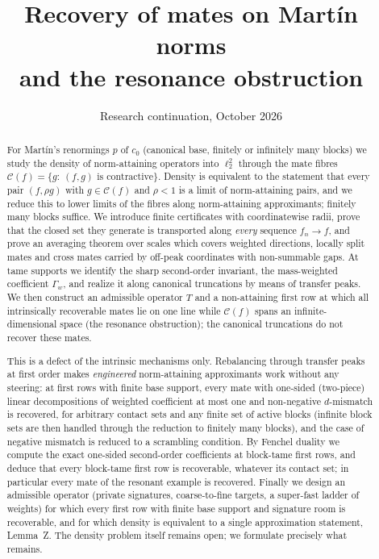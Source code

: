 \documentclass[10pt]{amsart}
\title{Recovery of mates on Mart\'in norms\\and the resonance obstruction}
\author{}
\date{Research continuation, October 2026}
\theoremstyle{definition}
\theoremstyle{remark}
\newcommand{\Cset}{\mathcal C}
\begin{document}
\begin{abstract}
For Mart\'in's renormings $p$ of $c_0$ (canonical base, finitely or
infinitely many blocks) we study the density of norm-attaining operators
into $\ell_2^2$ through the mate fibres
$\Cset(f)=\{g:\ (f,g)\text{ is contractive}\}$.  Density is equivalent to the
statement that every pair $(f,\rho g)$ with $g\in\Cset(f)$ and $\rho<1$ is a
limit of norm-attaining pairs, and we reduce this to lower limits of the
fibres along norm-attaining approximants; finitely many blocks suffice.  We
introduce finite certificates with coordinatewise radii, prove that the
closed set they generate is transported along \emph{every} sequence
$f_n\to f$, and prove an averaging theorem over scales which covers weighted
directions, locally split mates and cross mates carried by off-peak
coordinates with non-summable gaps.  At tame supports we identify the sharp
second-order invariant, the mass-weighted coefficient $\Gamma_w$, and
realize it along canonical truncations by means of transfer peaks.  We then
construct an admissible operator $T$ and a non-attaining first row at which
all intrinsically recoverable mates lie on one line while $\Cset(f)$ spans an
infinite-dimensional space (the resonance obstruction); the canonical
truncations do not recover these mates.

This is a defect of the intrinsic mechanisms only.  Rebalancing through
transfer peaks at first order makes \emph{engineered} norm-attaining
approximants work without any steering: at first rows with finite base
support, every mate with one-sided (two-piece) linear decompositions of
weighted coefficient at most one and non-negative $d$-mismatch is
recovered, for arbitrary contact sets and any finite set of active blocks
(infinite block sets are then handled through the reduction to finitely
many blocks), and the case of negative mismatch is reduced to a scrambling
condition.  By Fenchel duality we compute the exact one-sided second-order
coefficients at block-tame first rows, and deduce that every block-tame
first row is recoverable, whatever its contact set; in particular every mate
of the resonant example is recovered.  Finally we design an admissible
operator (private signatures, coarse-to-fine targets, a super-fast ladder
of weights) for which every first row with finite base support and
signature room is recoverable, and for which density is equivalent to a
single approximation statement, Lemma~Z.  The density problem itself
remains open; we formulate precisely what remains.
\end{abstract}
\maketitle
\tableofcontents
\end{document}
